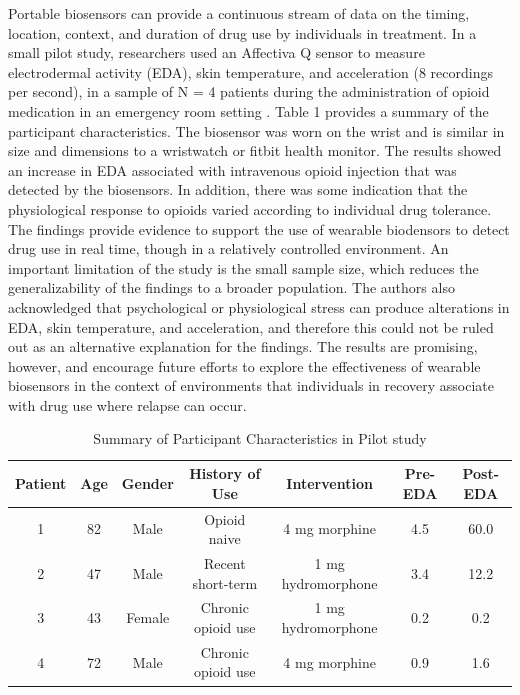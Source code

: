 \documentclass[sigconf]{acmart}
\begin{document}
Portable biosensors can provide a continuous stream of data on the timing, 
location, context, and duration of drug use by individuals in treatment. 
In a small pilot study, researchers used an Affectiva Q sensor to measure 
electrodermal activity (EDA), skin temperature, and acceleration (8 recordings 
per second), in a sample of N = 4 patients during the administration of opioid 
medication in an emergency room setting \cite{carreiro15}. Table 1 provides a 
summary of the participant characteristics. The biosensor was worn on the 
wrist and is similar in size and dimensions to a wristwatch or fitbit health
monitor. The results showed an increase in EDA associated with intravenous 
opioid injection that was detected by the biosensors. In addition, there was 
some indication that the physiological response to opioids varied according 
to individual drug tolerance. The findings provide evidence to support the 
use of wearable biodensors to detect drug use in real time, though in a 
relatively controlled environment. An important limitation of the study is 
the small sample size, which reduces the generalizability of the findings to 
a broader population. The authors also acknowledged that psychological or 
physiological stress can produce alterations in EDA, skin temperature, and 
acceleration, and therefore this could not be ruled out as an alternative 
explanation for the findings. The results are promising, however, and encourage 
future efforts to explore the effectiveness of wearable biosensors in the 
context of environments that individuals in recovery associate with drug use 
where relapse can occur.

\begin{table}
  \caption{Summary of Participant Characteristics in Pilot study \cite{carreiro15}}
  \label{tab:freq}
  \begin{tabular}{ccccccc}
    \toprule
     Patient& Age& Gender& History of Use& Intervention& Pre-EDA& Post-EDA \\
    \midrule
    1& 82& Male& Opioid naive& 4 mg morphine& 4.5& 60.0 \\
    2& 47& Male& Recent short-term& 1 mg hydromorphone& 3.4& 12.2 \\
    3& 43& Female& Chronic opioid use& 1 mg hydromorphone& 0.2& 0.2 \\
    4& 72& Male& Chronic opioid use& 4 mg morphine& 0.9& 1.6 \\
    \bottomrule
  \end{tabular}
\end{table}
\end{document}
